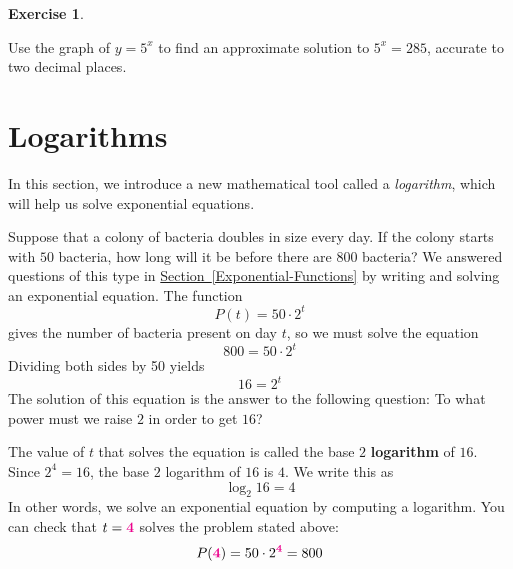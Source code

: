 \documentclass[10pt,]{book}
\newcommand{\terminology}[1]{\textbf{#1}}
\theoremstyle{plain}
\theoremstyle{definition}
\theoremstyle{definition}
\theoremstyle{definition}
\theoremstyle{definition}
\theoremstyle{definition}
\newtheorem{exercise}[theorem]{Exercise}
\numberwithin{equation}{section}
\newcommand{\alert}[1]{\mathbf{\color{magenta}{#1}}}
\begin{document}
\begin{exercise}\label{exercise-GC-exponential-equation}

	Use the graph of \(y = 5^x\) to find an approximate solution to \(5^x = 285\), accurate to two decimal places.
\end{exercise}
\typeout{************************************************}
\typeout{************************************************}
\section[Logarithms]{Logarithms}\label{Logarithms}

	In this section, we introduce a new mathematical tool called a \emph{logarithm}, which will help us solve exponential equations.
%
\par

	Suppose that a colony of bacteria doubles in size every day. If the colony starts with \(50\) bacteria, how long will it be before there are \(800\) bacteria? We answered questions of this type in \hyperref[Exponential-Functions]{Section~\ref{Exponential-Functions}} by writing and solving an exponential equation. The function
	\begin{equation*}P(t) = 50 \cdot 2^t\end{equation*}
	gives the number of bacteria present on day \(t\), so we must solve the equation
	\begin{equation*}800 = 50 \cdot 2^t\end{equation*}
	Dividing both sides by 50 yields
	\begin{equation*}16 = 2^t\end{equation*}
	The solution of this equation is the answer to the following question: To what power must we raise \(2\) in order to get \(16\)?
%
\par

	The value of \(t\) that solves the equation is called the base \(2\) \terminology{logarithm} of \(16\). Since \(2^4 = 16\), the base \(2\) logarithm of \(16\) is \(4\). We write this as
	\begin{equation*}\log_{2}16 = 4\end{equation*}
	In other words, we solve an exponential equation by computing a logarithm. You can check that \(t = \alert{4}\)
	solves the problem stated above:
	\begin{equation*}P(\alert{4}) = 50 \cdot 2^\alert{4}= 800\end{equation*}
%
\par
\end{document}
